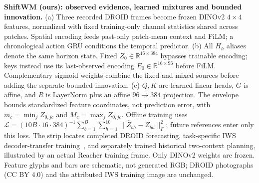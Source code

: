 \textbf{ShiftWM (ours): observed evidence, learned mixtures and bounded innovation.} (a) Three recorded DROID frames become frozen DINOv2 $4\!\times\!4$ features, normalized with fixed training-only channel statistics shared across patches. Spatial encoding feeds past-only patch-mean context and FiLM; a chronological action GRU conditions the temporal predictor. (b) All $H_h$ aliases denote the same horizon state. Fixed $Z_0\in\mathbb R^{16\times384}$ bypasses trainable encoding; keys instead use its last-observed encoding $E_0\in\mathbb R^{16\times96}$ before FiLM. Complementary sigmoid weights combine the fixed and mixed sources before adding the separate bounded innovation. (c) $Q,K$ are learned linear heads, $G$ is affine, and $R$ is LayerNorm plus an affine $96\to384$ projection. The envelope bounds standardized feature coordinates, not prediction error, with $m_c=\min_jZ_{0,jc}$ and $M_c=\max_jZ_{0,jc}$. Offline training uses $\mathcal L=(10B\cdot16\cdot384)^{-1}\sum_{b=1}^B\sum_{h=1}^{10}\|\hat Z_{bh}-Z_{bh}\|_F^2$; future references enter only this loss. The strip locates completed DROID forecasting, task-specific IWS decoder-transfer training~\citep{zhang2026rlawm}, and separately trained historical two-context planning, illustrated by an actual Reacher training frame. Only DINOv2 weights are frozen. Feature glyphs and bars are schematic, not generated RGB; DROID photographs (CC BY 4.0) and the attributed IWS training image are unchanged.
